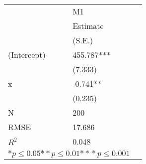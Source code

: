 \begin{tabular}{@{}l*{2}{l}@{}}
\hline
  &\multicolumn{1}{l}{M1  }\tabularnewline
 &\multicolumn{1}{l}{Estimate}\tabularnewline
 &\multicolumn{1}{l}{(S.E.)}\tabularnewline
 \hline
 \hline
  (Intercept) & 455.787*** \tabularnewline
 &(7.333)\tabularnewline
  x & -0.741** \tabularnewline
 &(0.235)\tabularnewline
 \hline
 N&\multicolumn{1}{l}{200} \tabularnewline
 RMSE&17.686\tabularnewline
 $R^2$&0.048\tabularnewline
 \hline
\hline
 
 \multicolumn{2}{l}{  ${*  p}\le 0.05$${*\!\!*  p}\le 0.01$${*\!\!*\!\!*  p}\le 0.001$}\tabularnewline
 \end{tabular}